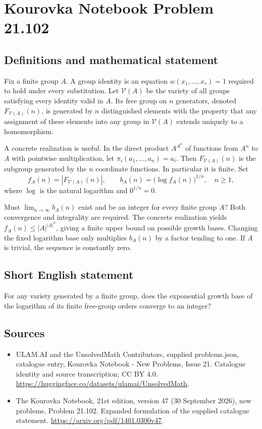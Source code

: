 \documentclass[11pt,a4paper]{article}
\begin{document}
\section*{Kourovka Notebook Problem 21.102}\label{statement}

\subsection{Definitions and mathematical statement}
Fix a finite group $A$. A group identity is an equation $w(x_1,\ldots,x_r)=1$ required to hold under every substitution. Let $\mathcal V(A)$ be the variety of all groups satisfying every identity valid in $A$. Its free group on $n$ generators, denoted $F_{\mathcal V(A)}(n)$, is generated by $n$ distinguished elements with the property that any assignment of these elements into any group in $\mathcal V(A)$ extends uniquely to a homomorphism.

A concrete realization is useful. In the direct product $A^{A^n}$ of functions from $A^n$ to $A$ with pointwise multiplication, let $\pi_i(a_1,\ldots,a_n)=a_i$. Then $F_{\mathcal V(A)}(n)$ is the subgroup generated by the $n$ coordinate functions. In particular it is finite. Set
\[
 f_A(n)=|F_{\mathcal V(A)}(n)|,\qquad
 b_A(n)=\bigl(\log f_A(n)\bigr)^{1/n},\quad n\ge1,
\]
where $\log$ is the natural logarithm and $0^{1/n}=0$.

Must $\lim_{n\to\infty}b_A(n)$ exist and be an integer for every finite group $A$? Both convergence and integrality are required. The concrete realization yields $f_A(n)\le|A|^{|A|^n}$, giving a finite upper bound on possible growth bases. Changing the fixed logarithm base only multiplies $b_A(n)$ by a factor tending to one. If $A$ is trivial, the sequence is constantly zero.
\subsection{Short English statement}
For any variety generated by a finite group, does the exponential growth base of the logarithm of its finite free-group orders converge to an integer?
\subsection{Sources}
\begin{itemize}
\item[S1] ULAM.AI and the UnsolvedMath Contributors, supplied problems.json, catalogue entry, Kourovka Notebook - New Problems, Issue 21. Catalogue identity and source transcription; CC BY 4.0.
\url{https://huggingface.co/datasets/ulamai/UnsolvedMath}.
\item[S2] The Kourovka Notebook, 21st edition, version 47 (30 September 2026), new problems, Problem 21.102. Expanded formulation of the supplied catalogue statement.
\url{https://arxiv.org/pdf/1401.0300v47}.
\end{itemize}
\end{document}
